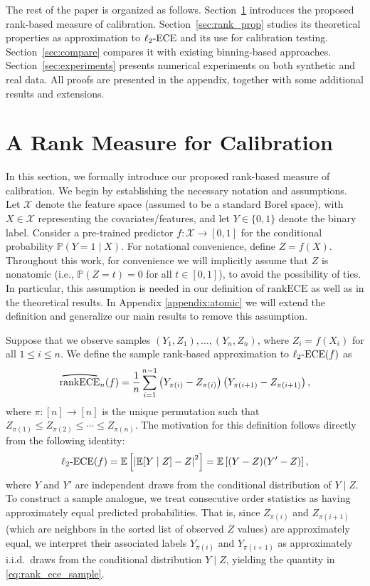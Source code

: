 \documentclass[11pt]{article}
\numberwithin{equation}{section}
\theoremstyle{definition}
\newcommand{\E}{\mathbb{E}}
\renewcommand{\P}{\mathbb{P}}
\newcommand{\cX}{\mathcal{X}}
\newcommand{\ra}{\rightarrow}
\newcommand{\myoverline}[2][3.5em]{%
  \overset{%
    \tikz[baseline=-0.1ex]{
      \draw[line width=0.75pt]
        (0,0) .. controls (#1/2,0.5ex) .. (#1,0);
    }%
  }{#2}%
}
\newcommand{\ECE}{\mathrm{ECE}}
\newcommand{\lECE}{\ell_2\textnormal{-}\ECE}
\newcommand{\rankECE}{\mathrm{rankECE}}
\newcommand{\hatrankECE}{\myoverline{\rankECE}}
\begin{document}
The rest of the paper is organized as follows. Section~\ref{sec:def_rank_ece} introduces the proposed rank-based measure of calibration. Section~\ref{sec:rank_prop} studies its theoretical properties as approximation to $\lECE$ and its use for calibration testing. Section~\ref{sec:compare} compares it with existing binning-based approaches. Section~\ref{sec:experiments} presents numerical experiments on both synthetic and real data. All proofs are presented in the appendix, together with some additional results and extensions.

\section{A Rank Measure for Calibration}\label{sec:def_rank_ece}
In this section, we formally introduce our proposed rank-based measure of calibration. We begin by establishing the necessary notation and assumptions. Let $\cX$ denote the feature space (assumed to be a standard Borel space), with $X\in\cX$ representing the covariates/features, and let $Y\in\{0,1\}$ denote the binary label. Consider a pre-trained predictor $f:\cX\ra[0,1]$ for the conditional probability $\P(Y=1\mid X)$. 
For notational convenience, define $Z = f(X)$. Throughout this work, for convenience we will implicitly assume that $Z$ is nonatomic (i.e., $\P(Z=t)=0$ for all $t\in[0,1]$), to avoid the possibility of ties. In particular, this assumption is needed in our definition of $\rankECE$ as well as in the theoretical results. In Appendix \ref{appendix:atomic} we will extend the definition and generalize our main results to remove this assumption.

Suppose that we observe samples $(Y_1,Z_1),\ldots,(Y_n,Z_n)$, where $Z_i=f(X_i)$ for all $1\leq i\leq n$. We define the sample rank-based approximation to $\lECE(f)$ as 
\begin{align}\label{eq:rank_ece_sample}
\hatrankECE_n(f)=\frac{1}{n}\sum_{i=1}^{n-1}\left(Y_{\pi(i)} - Z_{\pi(i)}\right)\left(Y_{\pi(i+1)} - Z_{\pi(i+1)}\right),
\end{align}
where $\pi:[n]\ra[n]$ is the unique permutation such that $Z_{\pi(1)}\leq Z_{\pi(2)}\leq \cdots \leq Z_{\pi(n)}$. The motivation for this definition follows directly from the following identity:
\begin{align*}
\lECE(f)=\E\left[\left|\E[Y\mid Z]-Z\right|^2\right]= \E\left[(Y-Z)(Y'-Z)\right],
\end{align*}
where $Y$ and $Y'$ are independent draws from the conditional distribution of $Y\mid Z$. To construct a sample analogue, we treat consecutive order statistics as having approximately equal predicted probabilities. That is, since $Z_{\pi(i)}$ and $Z_{\pi(i+1)}$ (which are neighbors in the sorted list of observed $Z$ values) are approximately equal, we interpret their associated labels $Y_{\pi(i)}$ and $Y_{\pi(i+1)}$ as approximately i.i.d.\ draws from the conditional distribution $Y\mid Z$, yielding the quantity in \eqref{eq:rank_ece_sample}.
\end{document}
